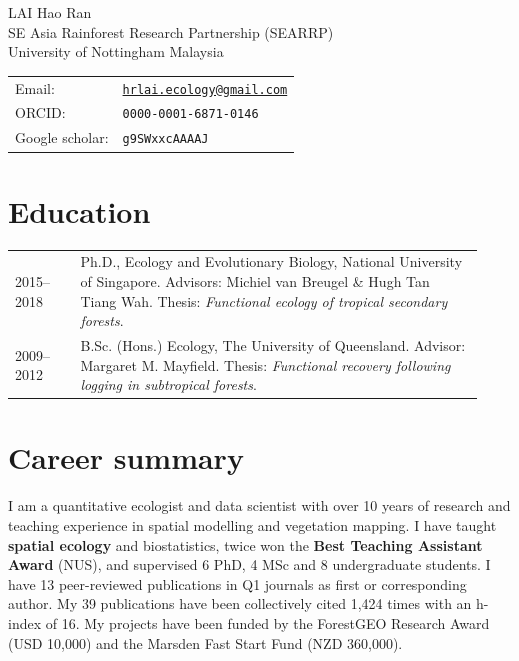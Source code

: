 \documentclass[a4paper]{article}
\def\name{LAI Hao Ran}
\renewcommand{\arraystretch}{1.5}
\begin{document}


\begin{minipage}{0.5\linewidth}
  {\LARGE \name} \\
  SE Asia Rainforest Research Partnership (SEARRP) \\
  University of Nottingham Malaysia
\end{minipage}
\begin{minipage}{0.5\linewidth}
\bgroup
\def\arraystretch{1}
  \begin{tabular}{ll}
    Email: & \href{mailto:hrlai.ecology@gmail.com}{\tt hrlai.ecology@gmail.com} \\
    ORCID: & \texttt{0000-0001-6871-0146} \\
    Google scholar: & \texttt{g9SWxxcAAAAJ} \\
  \end{tabular}
\egroup
\end{minipage}



\section*{Education}

\begin{tabular}{p{0.13\linewidth} p{0.8\linewidth}}

2015--2018 & Ph.D., Ecology and Evolutionary Biology, National University of Singapore. Advisors: Michiel van Breugel \& Hugh Tan Tiang Wah. Thesis: \textit{Functional ecology of tropical secondary forests}. \\

2009--2012 & B.Sc. (Hons.) Ecology, The University of Queensland. Advisor: Margaret M. Mayfield. Thesis: \textit{Functional recovery following logging in subtropical forests}. \\

\end{tabular}

\section*{Career summary}

I am a quantitative ecologist and data scientist with over 10 years of research and teaching experience in spatial modelling and vegetation mapping. I have taught \textbf{spatial ecology} and biostatistics, twice won the \textbf{Best Teaching Assistant Award} (NUS), and supervised 6 PhD, 4 MSc and 8 undergraduate students. I have 13 peer-reviewed publications in Q1 journals as first or corresponding author. My 39 publications have been collectively cited 1,424 times with an h-index of 16. My projects have been funded by the ForestGEO Research Award (USD 10,000) and the Marsden Fast Start Fund (NZD 360,000).
\end{document}
